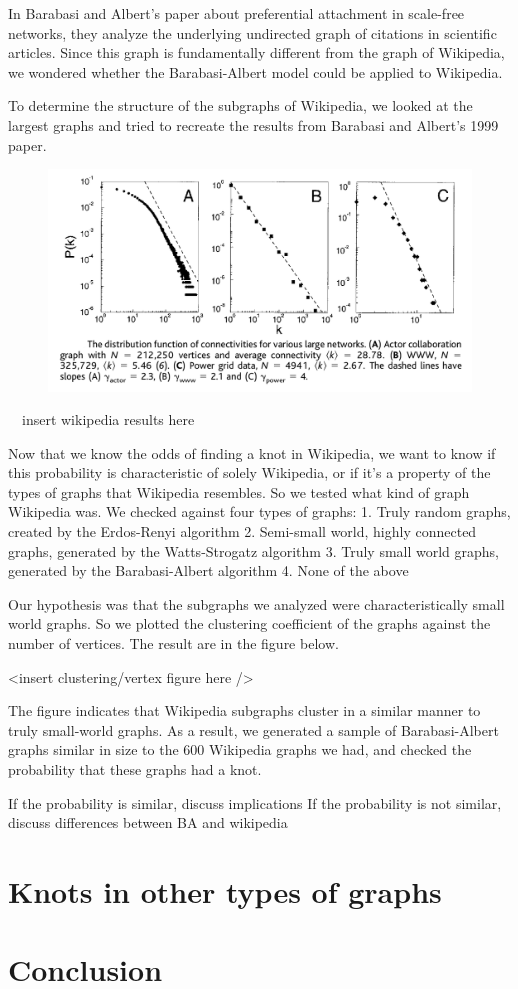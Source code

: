 \documentclass[10pt]{book}
\begin{document}
In Barabasi and Albert's paper about preferential attachment in scale-free networks, they analyze the underlying undirected graph of citations in scientific articles. Since this graph is fundamentally different from the graph of Wikipedia, we wondered whether the Barabasi-Albert model could be applied to Wikipedia.

To determine the structure of the subgraphs of Wikipedia, we looked at the largest graphs and tried to recreate the results from Barabasi and Albert's 1999 paper.

\begin{figure}[here]
 \centering
\includegraphics[scale=0.4]{../Images/BAResults.png}
\end{figure}


~~insert wikipedia results here~~

Now that we know the odds of finding a knot in Wikipedia, we want to know if this probability is characteristic of solely Wikipedia, or if it’s a property of the types of graphs that Wikipedia resembles. So we tested what kind of graph Wikipedia was. We checked against four types of graphs:
1. Truly random graphs, created by the Erdos-Renyi algorithm
2. Semi-small world, highly connected graphs, generated by the Watts-Strogatz algorithm
3. Truly small world graphs, generated by the Barabasi-Albert algorithm
4. None of the above

Our hypothesis was that the subgraphs we analyzed were characteristically small world graphs. So we plotted the clustering coefficient of the graphs against the number of vertices. The result are in the figure below.

<insert clustering/vertex figure here />

The figure indicates that Wikipedia subgraphs cluster in a similar manner to truly small-world graphs. As a result, we generated a sample of Barabasi-Albert graphs similar in size to the 600 Wikipedia graphs we had, and checked the probability that these graphs had a knot. 

If the probability is similar, discuss implications
If the probability is not similar, discuss differences between BA and wikipedia
\section{Knots in other types of graphs}
\section{Conclusion}
\end{document}
